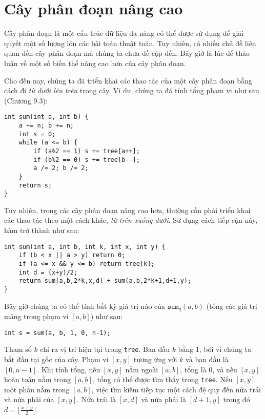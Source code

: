 \chapter{Cây phân đoạn nâng cao}


Cây phân đoạn là một cấu trúc dữ liệu đa năng
có thể được sử dụng để giải quyết một số lượng lớn các bài toán thuật toán.
Tuy nhiên, có nhiều chủ đề liên quan đến cây phân đoạn
mà chúng ta chưa đề cập đến.
Bây giờ là lúc để thảo luận về một số biến thể nâng cao hơn
của cây phân đoạn.

Cho đến nay, chúng ta đã triển khai các thao tác
của một cây phân đoạn bằng cách đi \emph{từ dưới lên trên}
trong cây.
Ví dụ, chúng ta đã tính
tổng phạm vi như sau (Chương 9.3):

\begin{lstlisting}
int sum(int a, int b) {
    a += n; b += n;
    int s = 0;
    while (a <= b) {
        if (a%2 == 1) s += tree[a++];
        if (b%2 == 0) s += tree[b--];
        a /= 2; b /= 2;
    }
    return s;
}
\end{lstlisting}

Tuy nhiên, trong các cây phân đoạn nâng cao hơn,
thường cần phải triển khai các thao tác
theo một cách khác, \emph{từ trên xuống dưới}.
Sử dụng cách tiếp cận này, hàm trở thành như sau:
\begin{lstlisting}
int sum(int a, int b, int k, int x, int y) {
    if (b < x || a > y) return 0;
    if (a <= x && y <= b) return tree[k];
    int d = (x+y)/2;
    return sum(a,b,2*k,x,d) + sum(a,b,2*k+1,d+1,y);
}
\end{lstlisting}

Bây giờ chúng ta có thể tính bất kỳ giá trị nào của $\texttt{sum}_q(a,b)$
(tổng các giá trị mảng trong phạm vi $[a,b]$) như sau:
\begin{lstlisting}
int s = sum(a, b, 1, 0, n-1);
\end{lstlisting}

Tham số $k$ chỉ ra vị trí hiện tại
trong \texttt{tree}.
Ban đầu $k$ bằng 1, bởi vì chúng ta bắt đầu
tại gốc của cây.
Phạm vi $[x,y]$ tương ứng với $k$
và ban đầu là $[0,n-1]$.
Khi tính tổng,
nếu $[x,y]$ nằm ngoài $[a,b]$,
tổng là 0,
và nếu $[x,y]$ hoàn toàn nằm trong $[a,b]$,
tổng có thể được tìm thấy trong \texttt{tree}.
Nếu $[x,y]$ một phần nằm trong $[a,b]$,
việc tìm kiếm tiếp tục một cách đệ quy đến
nửa trái và nửa phải của $[x,y]$.
Nửa trái là $[x,d]$
và nửa phải là $[d+1,y]$
trong đó $d=\lfloor \frac{x+y}{2} \rfloor$.


